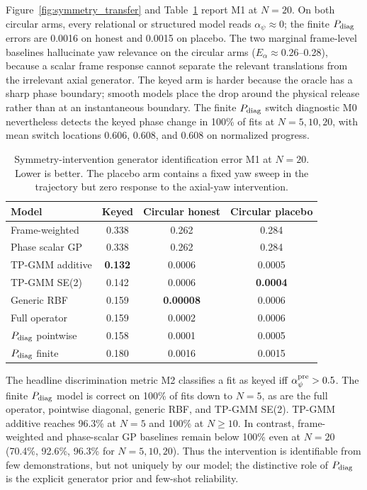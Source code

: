 \documentclass[letterpaper,10pt,conference]{ieeeconf}
\begin{document}
Figure~\ref{fig:symmetry_transfer} and Table~\ref{tab:sym_m1} report M1 at
$N=20$. On both circular arms, every
relational or structured model reads $\alpha_\psi\approx0$; the finite
$P_{\rm diag}$ errors are 0.0016 on honest and 0.0015 on placebo. The two
marginal frame-level baselines hallucinate yaw relevance on the circular arms
($E_\alpha\approx0.26$--0.28), because a scalar frame response cannot separate
the relevant translations from the irrelevant axial generator. The keyed arm is
harder because the oracle has a sharp phase boundary; smooth models place the
drop around the physical release rather than at an instantaneous boundary.
The finite $P_{\rm diag}$ switch diagnostic M0 nevertheless detects the keyed
phase change in 100\% of fits at $N=5,10,20$, with mean switch locations
0.606, 0.608, and 0.608 on normalized progress.

\begin{table}[t]
\centering
\caption{Symmetry-intervention generator identification error M1 at $N=20$.
Lower is better. The placebo arm contains a fixed yaw sweep in the trajectory
but zero response to the axial-yaw intervention.}
\label{tab:sym_m1}
\small
\setlength{\tabcolsep}{5.0pt}
\begin{tabular}{lccc}
\toprule
Model & Keyed & Circular honest & Circular placebo\\
\midrule
Frame-weighted & 0.338 & 0.262 & 0.284\\
Phase scalar GP & 0.338 & 0.262 & 0.284\\
TP-GMM additive & \textbf{0.132} & 0.0006 & 0.0005\\
TP-GMM SE(2) & 0.142 & 0.0006 & \textbf{0.0004}\\
Generic RBF & 0.159 & \textbf{0.00008} & 0.0006\\
Full operator & 0.159 & 0.0002 & 0.0006\\
$P_{\rm diag}$ pointwise & 0.158 & 0.0001 & 0.0005\\
$P_{\rm diag}$ finite & 0.180 & 0.0016 & 0.0015\\
\bottomrule
\end{tabular}
\end{table}

The headline discrimination metric M2 classifies a fit as keyed iff
$\alpha_\psi^{\rm pre}>0.5$. The finite $P_{\rm diag}$ model is correct on
100\% of fits down to $N=5$, as are the full operator, pointwise diagonal,
generic RBF, and TP-GMM SE(2). TP-GMM additive reaches 96.3\% at $N=5$ and
100\% at $N\geq10$. In contrast, frame-weighted and phase-scalar GP baselines
remain below 100\% even at $N=20$ (70.4\%, 92.6\%, 96.3\% for
$N=5,10,20$). Thus the intervention is identifiable from few demonstrations,
but not uniquely by our model; the distinctive role of $P_{\rm diag}$ is the
explicit generator prior and few-shot reliability.
\end{document}
